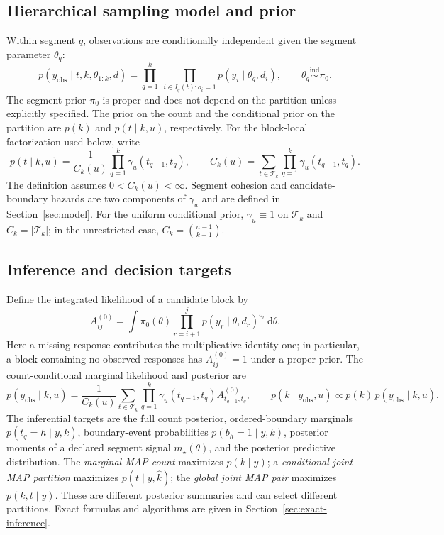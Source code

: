 \subsection{Hierarchical sampling model and prior}
Within segment $q$, observations are conditionally independent given the
segment parameter $\theta_q$:
\begin{equation}
 p(y_{\mathrm{obs}}\mid t,k,\theta_{1:k},d)
 =\prod_{q=1}^k\ \prod_{i\in I_q(t):o_i=1}
 p(y_i\mid\theta_q,d_i),
 \qquad \theta_q\overset{\mathrm{ind}}\sim\pi_0.
 \label{eq:setup-likelihood}
\end{equation}
The segment prior $\pi_0$ is proper and does not depend on the partition unless
explicitly specified. The prior on the count and the conditional prior on the
partition are $p(k)$ and $p(t\mid k,u)$, respectively. For the block-local
factorization used below, write
\begin{equation}
 p(t\mid k,u)=\frac{1}{C_k(u)}\prod_{q=1}^k
 \gamma_u(t_{q-1},t_q),\qquad
 C_k(u)=\sum_{t\in\mathcal T_k}\prod_{q=1}^k
 \gamma_u(t_{q-1},t_q).
 \label{eq:setup-prior}
\end{equation}
The definition assumes $0<C_k(u)<\infty$. Segment cohesion and
candidate-boundary hazards are two components of $\gamma_u$ and are defined in
Section~\ref{sec:model}. For the uniform conditional prior, $\gamma_u\equiv1$
on $\mathcal T_k$ and $C_k=|\mathcal T_k|$; in the unrestricted case,
$C_k=\binom{n-1}{k-1}$.

\subsection{Inference and decision targets}
Define the integrated likelihood of a candidate block by
\begin{equation}
 A^{(0)}_{ij}=\int\!\pi_0(\theta)
 \prod_{r=i+1}^j p(y_r\mid\theta,d_r)^{o_r}\,\mathrm d\theta.
 \label{eq:setup-block}
\end{equation}
Here a missing response contributes the multiplicative identity one; in
particular, a block containing no observed responses has $A^{(0)}_{ij}=1$ under
a proper prior. The count-conditional marginal likelihood and posterior are
\begin{equation}
 p(y_{\mathrm{obs}}\mid k,u)
 =\frac{1}{C_k(u)}\sum_{t\in\mathcal T_k}
 \prod_{q=1}^k \gamma_u(t_{q-1},t_q)
 A^{(0)}_{t_{q-1},t_q},\qquad
 p(k\mid y_{\mathrm{obs}},u)\propto p(k)\,p(y_{\mathrm{obs}}\mid k,u).
 \label{eq:setup-evidence}
\end{equation}
The inferential targets are the full count posterior, ordered-boundary
marginals $p(t_q=h\mid y,k)$, boundary-event probabilities
$p(b_h=1\mid y,k)$, posterior moments of a declared segment signal
$m_\star(\theta)$, and the posterior predictive distribution. The
\emph{marginal-MAP count} maximizes $p(k\mid y)$; a \emph{conditional joint MAP
partition} maximizes $p(t\mid y,\widehat k)$; the \emph{global joint MAP pair}
maximizes $p(k,t\mid y)$. These are different posterior summaries and can
select different partitions. Exact formulas and algorithms are given in
Section~\ref{sec:exact-inference}.

